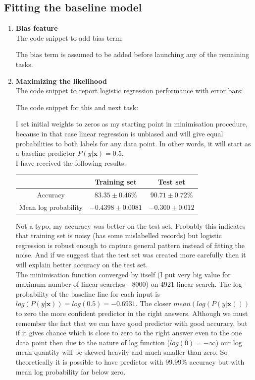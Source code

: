 \documentclass{article}
\newcommand{\vect}[1]{\boldsymbol{#1}} %
\begin{document}
			\subsection{Fitting the baseline model}
				\begin{enumerate}[label=(\alph*)]
					\item
						\textbf{Bias feature} \\
						The code snippet to add bias term:
						
						The bias term is assumed to be added before launching any of the remaining tasks.
					\item
						\textbf{ Maximizing the likelihood} \\
						The code snippet to report logistic regression performance with error bars:
						
						The code snippet for this and next task:
						
						I set initial weights to zeros as my starting point in minimisation procedure, because in that case linear regression is unbiased and will give equal probabilities to both labels for any data point. In other words,  it will start as a baseline predictor $P(y | \vect{x}) = 0.5$.\\
						I have received the following results:
						\begin{center}
							\begin{tabular}{| c | c | c |}
								\hline
								\, &  Training set & Test set \\ 
								\hline
								Accuracy                  & $83.35 \pm 0.46 \%$ & $90.71 \pm 0.72 \%$ \\ 
								\hline
								Mean log probability &$-0.4398 \pm 0.0081$ & $-0.300 \pm 0.012 $ \\
								\hline
							\end{tabular}
						\end{center}
						Not a typo, my accuracy was better on the test set. Probably this indicates that training set is noisy (has some mislabelled records) but logistic regression is robust enough to capture general pattern instead of fitting the noise. And if we suggest that the test set was created more carefully then it will explain better accuracy on the test set.
						\\
						The minimisation function converged by itself (I put very big value for maximum number of linear searches - 8000) on 4921 linear search.  The log probability of the baseline line for each input is $log(P(y | \vect{x})) = log(0.5) = -0.6931$. The closer $mean(log(P(y|\vect{x})))$ to zero the more confident predictor in the right answers. Although we must remember the fact that we can have good predictor with good accuracy, but if it gives chance which is close to zero to the right answer even to the one data point then due to the nature of log function ($log(0)= -\infty$) our log mean quantity will be skewed heavily and much smaller than zero. So theoretically it is possible to have predictor with 99.99\% accuracy but with mean log probability far below zero.

\end{enumerate}
\end{document}
